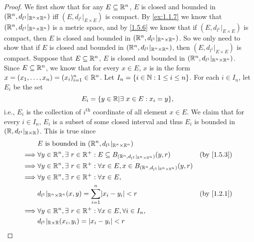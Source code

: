\begin{proof}
  We first show that for any \(E \subseteq \mathbb{R}^n\), \(E\) is closed and bounded in \((\mathbb{R}^n, d_{l^1}|_{\mathbb{R}^n \times \mathbb{R}^n})\) iff \((E, d_{l^1}|_{E \times E})\) is compact.
  By \cref{ex:1.1.7} we know that \((\mathbb{R}^n, d_{l^1}|_{\mathbb{R}^n \times \mathbb{R}^n})\) is a metric space, and by \cref{1.5.6} we know that if \((E, d_{l^1}|_{E \times E})\) is compact, then \(E\) is closed and bounded in \((\mathbb{R}^n, d_{l^1}|_{\mathbb{R}^n \times \mathbb{R}^n})\).
  So we only need to show that if \(E\) is closed and bounded in \((\mathbb{R}^n, d_{l^1}|_{\mathbb{R}^n \times \mathbb{R}^n})\), then \((E, d_{l^1}|_{E \times E})\) is compact.
  Suppose that \(E \subseteq \mathbb{R}^n\), \(E\) is closed and bounded in \((\mathbb{R}^n, d_{l^1}|_{\mathbb{R}^n \times \mathbb{R}^n})\).
  Since \(E \subseteq \mathbb{R}^n\), we know that for every \(x \in E\), \(x\) is in the form \(x = (x_1, \dots, x_n) = (x_i)_{i = 1}^n \in \mathbb{R}^n\).
  Let \(I_n = \{i \in \mathbb{N} : 1 \leq i \leq n\}\).
  For each \(i \in I_n\), let \(E_i\) be the set
  \[
    E_i = \{y \in \mathbb{R} | \exists\ x \in E : x_i = y\},
  \]
  i.e., \(E_i\) is the collection of \(i^{\text{th}}\) coordinate of all element \(x \in E\).
  We claim that for every \(i \in I_n\), \(E_i\) is a subset of some closed interval and thus \(E_i\) is bounded in \((\mathbb{R}, d_{l^1}|_{\mathbb{R} \times \mathbb{R}})\).
  This is true since
  \begin{align*}
             & E \text{ is bounded in } (\R^n, d_{l^1}|_{\R^n \times \R^n})                                                                              \\
    \implies & \forall y \in \R^n, \exists\ r \in \R^+ : E \subseteq B_{(\R^n, d_{l^1}|_{\R^n \times \R^n})}(y, r)            & \text{(by \cref{1.5.3})} \\
    \implies & \forall y \in \R^n, \exists\ r \in \R^+ : \forall x \in E, x \in B_{(\R^n, d_{l^1}|_{\R^n \times \R^n})}(y, r)                            \\
    \implies & \forall y \in \R^n, \exists\ r \in \R^+ : \forall x \in E,                                                                                \\
             & d_{l^1}|_{\R^n \times \R^n}(x, y) = \sum_{i = 1}^n \abs{x_i - y_i} < r                                         & \text{(by \cref{1.2.1})} \\
    \implies & \forall y \in \R^n, \exists\ r \in \R^+ : \forall x \in E, \forall i \in I_n,                                                             \\
             & d_{l^1}|_{\R \times \R}(x_i, y_i) = \abs{x_i - y_i} < r                                                                                   \\

\end{align*}
\end{proof}
